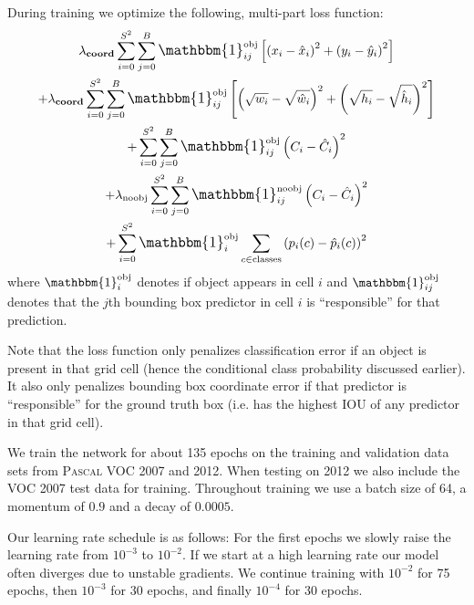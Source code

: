 \documentclass[10pt,twocolumn,letterpaper]{article}
\begin{document}
During training we optimize the following, multi-part loss function:
\scriptsize
\begin{multline}
\lambda_\textbf{coord}
\sum_{i = 0}^{S^2}
    \sum_{j = 0}^{B}
     \mathlarger{\mathbbm{1}}_{ij}^{\text{obj}}
            \left[
            \left(
                x_i - \hat{x}_i
            \right)^2 +
            \left(
                y_i - \hat{y}_i
            \right)^2
            \right]
\\
+ \lambda_\textbf{coord} 
\sum_{i = 0}^{S^2}
    \sum_{j = 0}^{B}
         \mathlarger{\mathbbm{1}}_{ij}^{\text{obj}}
         \left[
        \left(
            \sqrt{w_i} - \sqrt{\hat{w}_i}
        \right)^2 +
        \left(
            \sqrt{h_i} - \sqrt{\hat{h}_i}
        \right)^2
        \right]
\\
+ \sum_{i = 0}^{S^2}
    \sum_{j = 0}^{B}
        \mathlarger{\mathbbm{1}}_{ij}^{\text{obj}}
        \left(
            C_i - \hat{C}_i
        \right)^2
\\
+ \lambda_\textrm{noobj}
\sum_{i = 0}^{S^2}
    \sum_{j = 0}^{B}
    \mathlarger{\mathbbm{1}}_{ij}^{\text{noobj}}
        \left(
            C_i - \hat{C}_i
        \right)^2
\\
+ \sum_{i = 0}^{S^2}
\mathlarger{\mathbbm{1}}_i^{\text{obj}}
    \sum_{c \in \textrm{classes}}
        \left(
            p_i(c) - \hat{p}_i(c)
        \right)^2
\end{multline}
\normalsize
where $\mathbbm{1}_i^{\text{obj}}$ denotes if object appears in cell $i$ and $\mathbbm{1}_{ij}^{\text{obj}}$ denotes that the $j$th bounding box predictor in cell $i$ is ``responsible'' for that prediction.

Note that the loss function only penalizes classification error if an object is present in that grid cell (hence the conditional class probability discussed earlier). It also only penalizes bounding box coordinate error if that predictor is ``responsible'' for the ground truth box (i.e. has the highest IOU of any predictor in that grid cell).

We train the network for about 135 epochs on the training and validation data sets from \textsc{Pascal} VOC 2007 and 2012. When testing on 2012 we also include the VOC 2007 test data for training. Throughout training we use a batch size of 64, a momentum of $0.9$ and a decay of $0.0005$.

Our learning rate schedule is as follows: For the first epochs we slowly raise the learning rate from $10^{-3}$ to $10^{-2}$. If we start at a high learning rate our model often diverges due to unstable gradients. We continue training with $10^{-2}$ for 75 epochs, then $10^{-3}$ for 30 epochs, and finally $10^{-4}$ for 30 epochs.
\end{document}
